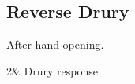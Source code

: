 \subsection{Reverse Drury}

After  hand opening.

\begin{bidtable}
    2\C & Drury response \\
    \\
\end{bidtable}

